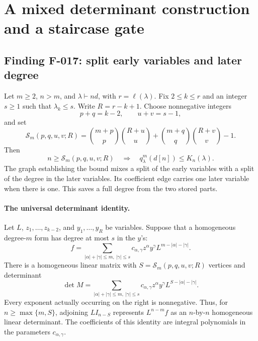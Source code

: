 \section{A mixed determinant construction and a staircase gate}

\subsection*{Finding F-017: split early variables and later degree}
Let \(m\geq2\), \(n>m\), and \(\lambda\vdash nd\), with
\(r=\ell(\lambda)\). Fix \(2\leq k\leq r\) and an integer
\(s\geq1\) such that \(\lambda_k\leq s\). Write
\(R=r-k+1\). Choose nonnegative integers
\[
                   p+q=k-2,\qquad u+v=s-1,
\]
and set
\begin{equation}\label{eq:F017size}
 \mathcal S_m(p,q,u,v;R)=
 \binom{m+p}{p}\binom{R+u}{u}
 +\binom{m+q}{q}\binom{R+v}{v}-1.
\end{equation}
Then
\begin{equation}\label{eq:F017compare}
 n\geq\mathcal S_m(p,q,u,v;R)
       \quad\Longrightarrow\quad
                  q^m_\lambda(d[n])\leq K_n(\lambda).
\end{equation}
The graph establishing the bound mixes a split of the early
variables with a split of the degree in the later variables.
Its coefficient edge carries one later variable when there
is one. This saves a full degree from the two stored parts.

\paragraph{The universal determinant identity.}
Let \(L\), \(z_1,\ldots,z_{k-2}\), and
\(y_1,\ldots,y_R\) be variables. Suppose that a homogeneous
degree-\(m\) form has degree at most \(s\) in the \(y\)'s:
\[
 f=\sum_{|\alpha|+|\gamma|\leq m,\ |\gamma|\leq s}
              c_{\alpha,\gamma}z^\alpha y^\gamma
                                      L^{m-|\alpha|-|\gamma|}.
\]
There is a homogeneous linear matrix with
\(S=\mathcal S_m(p,q,u,v;R)\) vertices and determinant
\begin{equation}\label{eq:F017identity}
 \det M=
 \sum_{|\alpha|+|\gamma|\leq m,\ |\gamma|\leq s}
      c_{\alpha,\gamma}z^\alpha y^\gamma
                                      L^{S-|\alpha|-|\gamma|}.
\end{equation}
Every exponent actually occurring on the right is nonnegative.
Thus, for \(n\geq\max\{m,S\}\), adjoining
\(L I_{n-S}\) represents \(L^{n-m}f\) as an
\(n\)-by-\(n\) homogeneous linear determinant.
The coefficients of this identity are integral polynomials
in the parameters \(c_{\alpha,\gamma}\).

